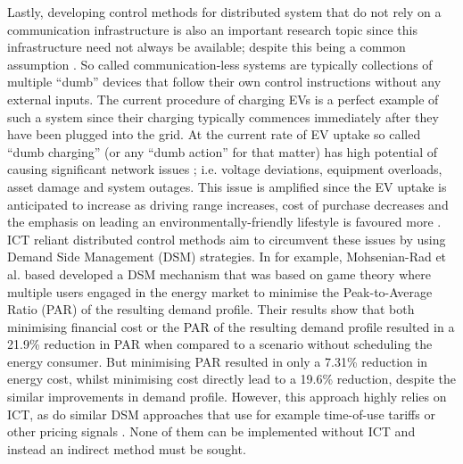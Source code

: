 Lastly, developing control methods for distributed system that do not rely on a communication infrastructure is also an important research topic since this infrastructure need not always be available; despite this being a common assumption \cite{Hatziargyriou2015}.
So called communication-less systems are typically collections of multiple ``dumb'' devices that follow their own control instructions without any external inputs.
The current procedure of charging EVs is a perfect example of such a system since their charging typically commences immediately after they have been plugged into the grid.
At the current rate of EV uptake so called ``dumb charging'' (or any ``dumb action'' for that matter) has high potential of causing significant network issues \cite{Hota2014, Liu2015a}; i.e. voltage deviations, equipment overloads, asset damage and system outages.
This issue is amplified since the EV uptake is anticipated to increase as driving range increases, cost of purchase decreases and the emphasis on leading an environmentally-friendly lifestyle is favoured more \cite{Shah2015}.
ICT reliant distributed control methods aim to circumvent these issues by using Demand Side Management (DSM) strategies.
In \cite{Mohsenian-Rad2010} for example, Mohsenian-Rad et al. based developed a DSM mechanism that was based on game theory where multiple users engaged in the energy market to minimise the Peak-to-Average Ratio (PAR) of the resulting demand profile.
Their results show that both minimising financial cost or the PAR of the resulting demand profile resulted in a 21.9\% reduction in PAR when compared to a scenario without scheduling the energy consumer.
But minimising PAR resulted in only a 7.31\% reduction in energy cost, whilst minimising cost directly lead to a 19.6\% reduction, despite the similar improvements in demand profile.
However, this approach highly relies on ICT, as do similar DSM approaches that use for example time-of-use tariffs \cite{Deilami2011, Surles2012} or other pricing signals \cite{Masoum2015}.
None of them can be implemented without ICT and instead an indirect method must be sought.



